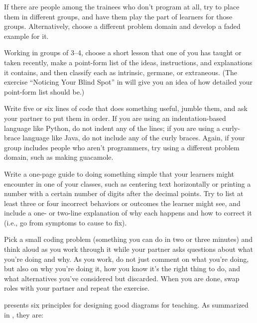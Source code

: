 If there are people among the trainees who don't program at all, try
to place them in different groups, and have them play the part of
learners for those groups.  Alternatively, choose a different problem
domain and develop a faded example for it.


Working in groups of 3--4, choose a short lesson that one of you has
taught or taken recently, make a point-form list of the ideas,
instructions, and explanations it contains, and then classify each as
intrinsic, germane, or extraneous.  (The exercise ``Noticing Your
Blind Spot'' in  will give you an idea
of how detailed your point-form list should be.)


Write five or six lines of code that does something useful, jumble
them, and ask your partner to put them in order. If you are using an
indentation-based language like Python, do not indent any of the
lines; if you are using a curly-brace language like Java, do not
include any of the curly braces.  Again, if your group includes people
who aren't programmers, try using a different problem domain, such as
making guacamole.


Write a one-page guide to doing something simple that your learners
might encounter in one of your classes, such as centering text
horizontally or printing a number with a certain number of digits
after the decimal points.  Try to list at least three or four
incorrect behaviors or outcomes the learner might see, and include a
one- or two-line explanation of why each happens and how to correct it
(i.e., go from symptoms to cause to fix).


Pick a small coding problem (something you can do in two or three
minutes) and think aloud as you work through it while your partner
asks questions about what you're doing and why.  As you work, do not
just comment on what you're doing, but also on why you're doing it,
how you know it's the right thing to do, and what alternatives you've
considered but discarded.  When you are done, swap roles with your
partner and repeat the exercise.


\cite{Maye2009} presents six principles for designing good diagrams
for teaching. As summarized in \cite{Mill2016a}, they are:

